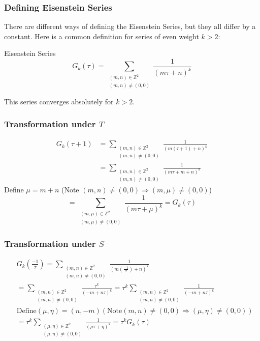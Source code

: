 \documentclass{beamer}
\begin{document}
\begin{frame}

\frametitle{Defining Eisenstein Series}
There are different ways of defining the Eisenstein Series, but they all differ by a constant. Here is a common definition for series of even weight $k>2$: 
\begin{block}{Eisenstein Series}
$$G_k(\tau) = \sum_{\substack{(m,n) \in \mathbb{Z}^2 \\ (m,n) \neq (0,0)}}  \frac{1}{(m \tau + n)^k}$$
\end{block}
This series converges absolutely for $k>2$.

\end{frame}

\begin{frame}
\frametitle{Transformation under $T$}

\begin{align*}
G_k(\tau + 1) &= \sum_{\substack{(m,n) \in \mathbb{Z}^2 \\ (m,n) \neq (0,0)}}  \frac{1}{(m (\tau +1) + n)^k} \\
& = \sum_{\substack{(m,n) \in \mathbb{Z}^2 \\ (m,n) \neq (0,0)}}  \frac{1}{(m \tau + m +  n)^k} 
\end{align*}
Define $\mu=m+n$ (Note $(m,n) \neq (0,0) \Rightarrow (m, \mu) \neq (0,0)$) \\
$$=  \sum_{\substack{(m,\mu) \in \mathbb{Z}^2 \\ (m,\mu) \neq (0,0)}}  \frac{1}{(m \tau + \mu)^k} = G_k(\tau)$$


\end{frame}

\begin{frame}
\frametitle{Transformation under $S$}

\begin{align*}
&G_k \left( \frac{-1}{\tau} \right) = \sum_{\substack{(m,n) \in \mathbb{Z}^2 \\ (m,n) \neq (0,0)}}  \frac{1}{(m (\frac{-1}{\tau}) + n)^k} \\
&= \sum_{\substack{(m,n) \in \mathbb{Z}^2 \\ (m,n) \neq (0,0)}}  \frac{\tau^k}{(-m + n \tau)^k} = \tau^k \sum_{\substack{(m,n) \in \mathbb{Z}^2 \\ (m,n) \neq (0,0)}}  \frac{1}{(-m + n \tau)^k} \\
& \text{Define} (\mu, \eta) = (n, -m) (\text{Note} (m,n) \neq (0,0) \Rightarrow (\mu, \eta) \neq (0,0)) \\
& = \tau^k \sum_{\substack{(\mu, \eta) \in \mathbb{Z}^2 \\ (\mu, \eta) \neq (0,0)}}  \frac{1}{(\mu \tau + \eta)^k} = \tau^k G_k(\tau)
\end{align*}

\end{frame}
\end{document}

